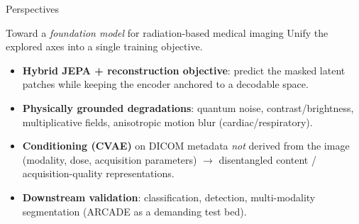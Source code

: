 \documentclass[aspectratio=169]{beamer}
\begin{document}
\begin{frame}{Perspectives}
  \begin{block}{Toward a \emph{foundation model} for radiation-based medical imaging}
  Unify the explored axes into a single training objective.
  \end{block}
  \begin{itemize}
    \item \textbf{Hybrid JEPA + reconstruction objective}: predict the masked
      latent patches while keeping the encoder anchored to a decodable space.
    \item \textbf{Physically grounded degradations}: quantum noise,
      contrast/brightness, multiplicative fields, anisotropic motion blur
      (cardiac/respiratory).
    \item \textbf{Conditioning (CVAE)} on DICOM metadata \emph{not} derived from the image
      (modality, dose, acquisition parameters) $\rightarrow$ disentangled
      content / acquisition-quality representations.
    \item \textbf{Downstream validation}: classification, detection,
      multi-modality segmentation (ARCADE as a demanding test bed).
  \end{itemize}
\end{frame}
\end{document}
